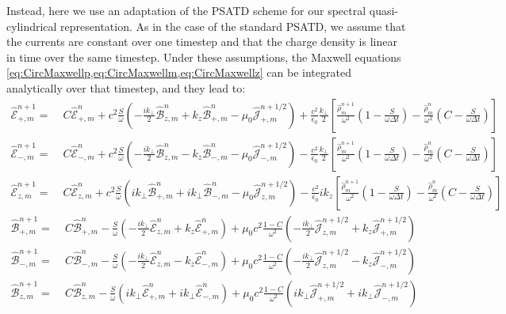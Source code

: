 \documentclass[1p,times]{elsarticle}
\newcommand{\tB}[2]{\spectral{B}_{#1,m}^{#2}}
\newcommand{\tE}[2]{\spectral{E}_{#1,m}^{#2}}
\newcommand{\tj}[2]{\spectral{J}_{#1,m}^{#2}}
\newcommand{\trho}[1]{\spectral{\rho}_{m}^{#1}}
\newcommand{\spectral}[1]{\hat{\mathcal{#1}}}
\begin{document}
Instead, here we use an adaptation of the PSATD scheme \citep{Haber}
for our spectral quasi-cylindrical representation. As in the case of the standard
PSATD, we assume that the currents are constant over one timestep and
that the charge density is linear in time over the same timestep. Under these
assumptions, the Maxwell equations \cref{eq:CircMaxwellp,eq:CircMaxwellm,eq:CircMaxwellz} can be integrated
analytically over that timestep, and they lead to:
\begin{subequations}
\begin{align}
\tE{+}{n+1} = \; & C \tE{+}{n} + 
c^2\frac{S}{\omega}\left(-\frac{ik_\perp }{2} \tB{z}{n} + k_z\tB{+}{n}
- \mu_0 \tj{+}{n+1/2} \right) + \frac{c^2}{\epsilon_0}
\frac{k_\perp}{2}\left[ \frac{\trho{n+1}}{\omega^2}\left(
  1 - \frac{S}{\omega\Delta t}\right) -
\frac{\trho{n}}{\omega^2}\left( C -\frac{S}{\omega\Delta t}\right)\right]  & \\
\tE{-}{n+1} =\; & C \tE{-}{n} +
c^2\frac{S}{\omega}\left(- \frac{ik_\perp }{2} \tB{z}{n} - k_z\tB{-}{n}
- \mu_0 \tj{-}{n+1/2} \right) - \frac{c^2}{\epsilon_0}
\frac{k_\perp}{2}\left[ \frac{\trho{n+1}}{\omega^2}\left(
  1 - \frac{S}{\omega\Delta t}\right) - \frac{\trho{n}}{\omega^2}
\left( C - \frac{S}{\omega\Delta t}\right)\right]  &\\
\tE{z}{n+1} =\; & C \tE{z}{n} + 
c^2\frac{S}{\omega}\left(ik_\perp \tB{+}{n} + ik_\perp \tB{-}{n}
- \mu_0 \tj{z}{n+1/2} \right) - \frac{c^2}{\epsilon_0}
ik_z\left[ \frac{\trho{n+1}}{\omega^2}\left(
  1 - \frac{S}{\omega\Delta t}\right) - \frac{\trho{n}}{\omega^2}
\left( C - \frac{S}{\omega\Delta t}\right)\right]  &
\end{align}
\end{subequations}
\begin{subequations}
\begin{align}
\tB{+}{n+1} = \; & C \tB{+}{n} - 
\frac{S}{\omega}\left(-\frac{ik_\perp }{2} \tE{z}{n} + k_z\tE{+}{n}
\right) + \mu_0 c^2\frac{1-C}{\omega^2} \left( -\frac{ik_\perp }{2}
  \tj{z}{n+1/2} + k_z \tj{+}{n+1/2} \right)& \\
\tB{-}{n+1} =\; & C \tB{-}{n} - 
\frac{S}{\omega}\left(- \frac{ik_\perp }{2} \tE{z}{n} - k_z\tE{-}{n}
\right) + \mu_0 c^2\frac{1-C}{\omega^2} \left( - \frac{ik_\perp }{2}
  \tj{z}{n+1/2} - k_z \tj{-}{n+1/2} \right) &\\
\tB{z}{n+1} =\; & C \tB{z}{n} - 
\frac{S}{\omega}\left(ik_\perp \tE{+}{n} + ik_\perp \tE{-}{n}
\right) + \mu_0 c^2\frac{1-C}{\omega^2} \left( ik_\perp
  \tj{+}{n+1/2} + ik_\perp \tj{-}{n+1/2} \right)&
\end{align}
\end{subequations}
\end{document}
